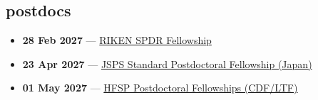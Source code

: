 \subsection*{postdocs}
\begin{itemize}[leftmargin=1.4em,itemsep=0.1em]
  \item \textbf{28 Feb 2027} --- \href{https://www.riken.jp/en/careers/programs/spdr}{RIKEN SPDR Fellowship}
  \item \textbf{23 Apr 2027} --- \href{https://www.jsps.go.jp/english/e-fellow/e-ippan/appliguidelines.html}{JSPS Standard Postdoctoral Fellowship (Japan)}
  \item \textbf{01 May 2027} --- \href{https://www.hfsp.org/funding/hfsp-funding/postdoctoral-fellowships}{HFSP Postdoctoral Fellowships (CDF/LTF)}
\end{itemize}

